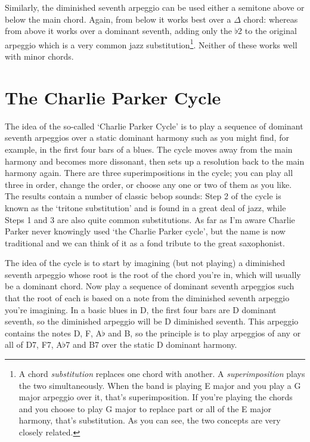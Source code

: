 \documentclass[english]{./gbook}
\begin{document}
\begin{large}
Similarly, the diminished seventh arpeggio can be used either a semitone above or below the main chord. Again, from below it works best over a $\Delta$ chord:
whereas from above it works over a dominant seventh, adding only the $\flat$2 to the original arpeggio
which is a very common jazz substitution\footnote{A chord \emph{substitution} replaces one chord with another. A \emph{superimposition} plays the two simultaneously. When the band is playing E major and you play a G major arpeggio over it, that's superimposition. If you're playing the chords and you choose to play G major to replace part or all of the E major harmony, that's substitution. As you can see, the two concepts are very closely related.}. Neither of these works well with minor chords.

\section{The Charlie Parker Cycle}

The idea of the so-called `Charlie Parker Cycle' is to play a sequence of dominant seventh arpeggios over a static dominant harmony such as you might find, for example, in the first four bars of a blues. The cycle moves away from the main harmony and becomes more dissonant, then sets up a resolution back to the main harmony again. There are three superimpositions in the cycle; you can play all three in order, change the order, or choose any one or two of them as you like. The results contain a number of classic bebop sounds: Step 2 of the cycle is known as the `tritone substitution' and is found in a great deal of jazz, while Steps 1 and 3 are also quite common substitutions. As far as I'm aware Charlie Parker never knowingly used `the Charlie Parker cycle', but the name is now traditional and we can think of it as a fond tribute to the great saxophonist.

The idea of the cycle is to start by imagining (but not playing) a diminished seventh arpeggio whose root is the root of the chord you're in, which will usually be a dominant chord. Now play a sequence of dominant seventh arpeggios such that the root of each is based on a note from the diminished seventh arpeggio you're imagining. In a basic blues in D, the first four bars are D dominant seventh, so the diminished arpeggio will be D diminished seventh. This arpeggio contains the notes D, F, A$\flat$ and B, so the principle is to play arpeggios of any or all of D7, F7, A$\flat$7 and B7 over the static D dominant harmony.


\end{large}
\end{document}
